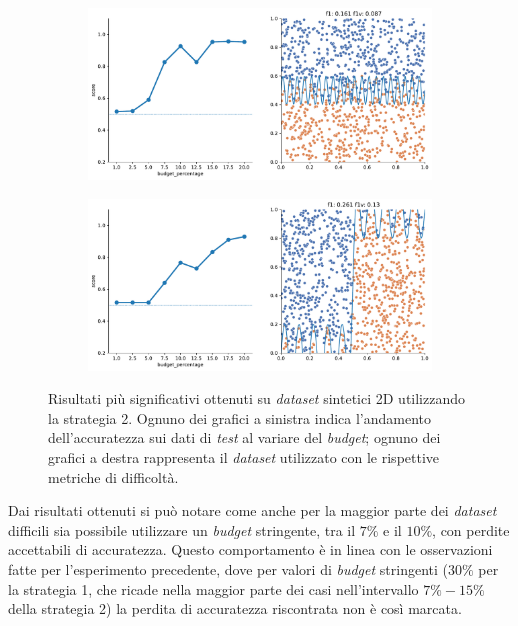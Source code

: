 \begin{figure}
\begin{subfigure}{.5\textwidth}
    \end{subfigure}%
    \hfill
    \begin{subfigure}{.5\textwidth}
        \centering
        \includegraphics[width=\textwidth]{img/2d_v2/14.pdf}
    \end{subfigure}
    \begin{subfigure}{.5\textwidth}
        \centering
        \includegraphics[width=\textwidth]{img/2d_v2/15.pdf}
    \end{subfigure}%
\caption[Risultati su \emph{dataset} sintetici utilizzando la strategia 2.]{Risultati più significativi ottenuti su \emph{dataset} sintetici 2D utilizzando la strategia 2. Ognuno dei grafici a sinistra indica l'andamento dell'accuratezza sui dati di \emph{test} al variare del \emph{budget}; ognuno dei grafici a destra rappresenta il \emph{dataset} utilizzato con le rispettive metriche di difficoltà.}
\label{fig:2d_v2}
\end{figure}
Dai risultati ottenuti si può notare come anche per la maggior parte dei \emph{dataset} difficili sia possibile utilizzare un \emph{budget} stringente, tra il $7\%$ e il $10\%$, con perdite accettabili di accuratezza.
Questo comportamento è in linea con le osservazioni fatte per l'esperimento precedente, dove per valori di \emph{budget} stringenti ($30\%$ per la strategia 1, che ricade nella maggior parte dei casi nell'intervallo $7\%-15\%$ della strategia 2) la perdita di accuratezza riscontrata non è così marcata.

